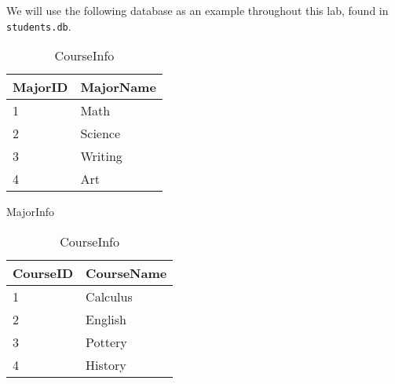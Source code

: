
We will use the following database as an example throughout this lab, found in \texttt{students.db}.

\begin{table}[H]
\begin{subtable}{0.55\textwidth}
    \centering
    \begin{subtable}{.45\textwidth}
        \centering
        \footnotesize
        \begin{tabular}{|l|l|}
            \hline MajorID & MajorName \\ \hline
            1 & Math \\
            2 & Science \\
            3 & Writing \\
            4 & Art \\ \hline
        \end{tabular}
        \caption{MajorInfo}
        \label{table:sql2-student-majorinfo}
    \end{subtable}
    \hfil
    \begin{subtable}{.45\textwidth}
        \centering
        \footnotesize
        \begin{tabular}{|l|l|}
            \hline CourseID & CourseName \\ \hline
            1 & Calculus \\
            2 & English \\
            3 & Pottery \\
            4 & History \\ \hline
        \end{tabular}
        \caption{CourseInfo}
        \label{table:sql2-student-courseinfo}
    \end{subtable}
    \\[1.em] %
    \begin{subtable}{\textwidth}

\end{subtable}
\end{subtable}
\end{table}
